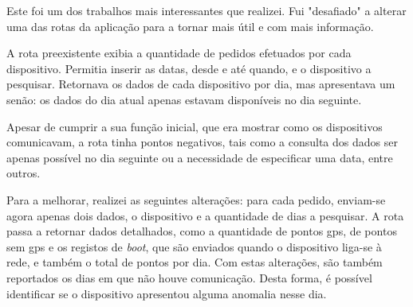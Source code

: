 
Este foi um dos trabalhos mais interessantes que realizei. Fui "desafiado" a alterar uma das rotas da aplicação para a tornar mais útil e com mais informação.

A rota preexistente exibia a quantidade de pedidos efetuados por cada dispositivo. Permitia inserir as datas, desde e até quando, e o dispositivo a pesquisar. Retornava os dados de cada dispositivo por dia, mas apresentava um senão: os dados do dia atual apenas estavam disponíveis no dia seguinte.

Apesar de cumprir a sua função inicial, que era mostrar como os dispositivos comunicavam, a rota tinha pontos negativos, tais como a consulta dos dados ser apenas possível no dia seguinte ou a necessidade de especificar uma data, entre outros.

Para a melhorar, realizei as seguintes alterações: para cada pedido, enviam-se agora apenas dois dados, o dispositivo e a quantidade de dias a pesquisar. A rota passa a retornar dados detalhados, como a quantidade de pontos \acs{gps}, de pontos sem \acs{gps} e os registos de \textit{boot}, que são enviados quando o dispositivo liga-se à rede, e também o total de pontos por dia. Com estas alterações, são também reportados os dias em que não houve comunicação. Desta forma, é possível identificar se o dispositivo apresentou alguma anomalia nesse dia.



